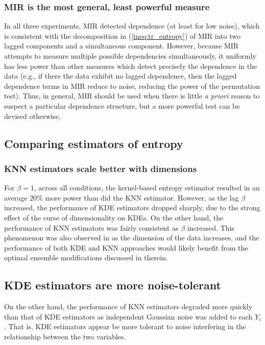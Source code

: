 \documentclass{article} %
\begin{document}
\subsubsection{MIR is the most general, least powerful measure}
In all three experiments, MIR detected dependence (at least for low noise),
which is consistent with the decomposition in (\ref{ineq:tr_entropy}) of MIR
into two lagged components and a simultaneous component. However, because MIR
attempts to measure multiple possible dependencies simultaneously, it uniformly
has less power than other measures which detect precisely the dependence in the
data (e.g., if there the data exhibit no lagged dependence, then the lagged
dependence terms in MIR reduce to noise, reducing the power of the permutation
test). Thus, in general, MIR should be used when there is little
\emph{a priori} reason to suspect a particular dependence structure, but a
more powerful test can be devised otherwise.

\subsection{Comparing estimators of entropy}

\subsubsection{KNN estimators scale better with dimensions}
For $\beta = 1$, across all conditions, the kernel-based entropy estimator
resulted in an average $20\%$ more power than did the KNN estimator. However,
as the lag $\beta$ increased, the performance of KDE estimators dropped
sharply, due to the strong effect of the curse of dimensionality on KDEs. On
the other hand, the performance of KNN estimators was fairly consistent as
$\beta$ increased. This phenomenon was also observed in \citet{moon14ensemble}
as the dimension of the data increases, and the performance of both KDE and KNN
approaches would likely benefit from the optimal ensemble modifications
discussed in therein.

\subsection{KDE estimators are more noise-tolerant}
On the other hand, the performance of KNN estimators degraded more quickly than
that of KDE estimators as independent Gaussian noise was added to each $Y_i$.
That is, KDE estimators appear be more tolerant to noise interfering in the
relationship between the two variables.
\end{document}
